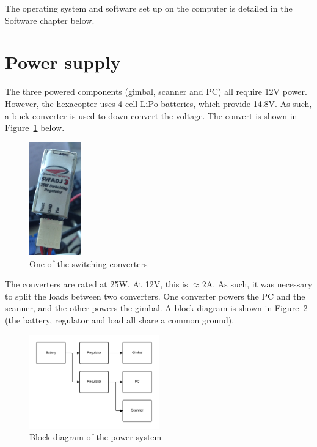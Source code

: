 \documentclass[12pt,oneside,a4paper,draft]{book}
\begin{document}
The operating system and software set up on the computer is detailed
in the Software chapter below.
\newpage
\section{Power supply}
\label{sec:power-supply-cons}

The three powered components (gimbal, scanner and PC) all require 12V
power. However, the hexacopter uses 4 cell LiPo batteries, which
provide 14.8V. As such, a buck converter is used to down-convert the
voltage. The convert is shown in
Figure~\ref{fig:converter} below.

\begin{figure}[h!]
  \centering
  \includegraphics[width=0.2\textwidth]{figs/converter}
  \caption{One of the switching converters}
  \label{fig:converter}
\end{figure}

The converters are rated at 25W. At 12V, this is $\approx 2$A. As
such, it was necessary to split the loads between two converters. One
converter powers the PC and the scanner, and the other powers the
gimbal. A block diagram is shown in Figure~\ref{fig:power} (the
battery, regulator and load all share a common ground).

\begin{figure}[h!]
  \centering
  \includegraphics[width=0.5\textwidth]{figs/power}
  \caption{Block diagram of the power system}
  \label{fig:power}
\end{figure}
\end{document}
